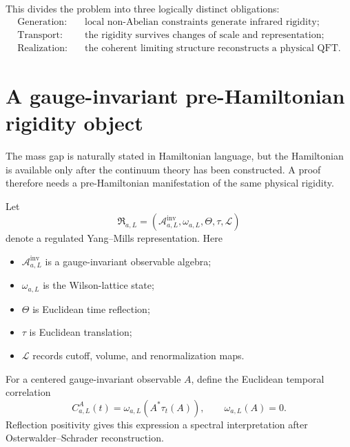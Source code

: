 \documentclass[11pt]{article}
\theoremstyle{remark}
\newcommand{\cA}{\mathcal{A}}
\begin{document}
This divides the problem into three logically distinct obligations:
\begin{equation}
\boxed{
\begin{aligned}
\text{Generation:}\quad&
  \text{local non-Abelian constraints generate infrared rigidity};\\
\text{Transport:}\quad&
  \text{the rigidity survives changes of scale and representation};\\
\text{Realization:}\quad&
  \text{the coherent limiting structure reconstructs a physical QFT}.
\end{aligned}}
\label{eq:three-obligations}
\end{equation}

\section{A gauge-invariant pre-Hamiltonian rigidity object}

The mass gap is naturally stated in Hamiltonian language, but the Hamiltonian
is available only after the continuum theory has been constructed.  A proof
therefore needs a pre-Hamiltonian manifestation of the same physical rigidity.

Let
\begin{equation}
  \mathfrak R_{a,L}
  =
  \left(
    \cA^{\mathrm{inv}}_{a,L},
    \omega_{a,L},
    \Theta,
    \tau,
    \mathcal L
  \right)
  \label{eq:regulated-package}
\end{equation}
denote a regulated Yang--Mills representation.  Here
\begin{itemize}[leftmargin=2em]
  \item $\cA^{\mathrm{inv}}_{a,L}$ is a gauge-invariant observable algebra;
  \item $\omega_{a,L}$ is the Wilson-lattice state;
  \item $\Theta$ is Euclidean time reflection;
  \item $\tau$ is Euclidean translation;
  \item $\mathcal L$ records cutoff, volume, and renormalization maps.
\end{itemize}

For a centered gauge-invariant observable $A$, define the Euclidean temporal
correlation
\begin{equation}
  C^A_{a,L}(t)
  =
  \omega_{a,L}\!\left(A^*\tau_t(A)\right),
  \qquad
  \omega_{a,L}(A)=0.
  \label{eq:regulated-correlation}
\end{equation}
Reflection positivity gives this expression a spectral interpretation after
Osterwalder--Schrader reconstruction.
\end{document}
